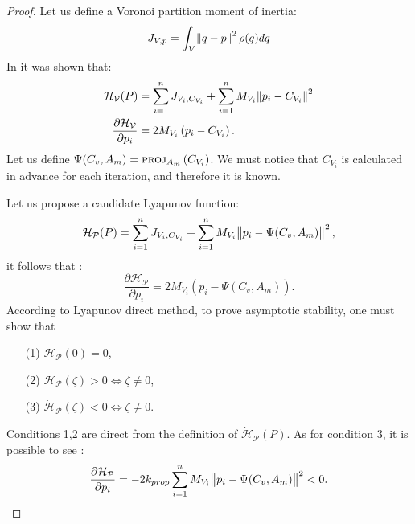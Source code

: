 \documentclass{iacas}
\begin{document}
\begin{proof}
Let us define a Voronoi partition moment of inertia:
\begin{equation}
J_{V,p} = \int_V \norm{q-p}^2 \rho(q)dq
\end{equation}
In \cite{Cortes2004} it was shown that:
\begin{align*}
\mathcal{H}_{\mathcal{V}}(P) &= \sum_{i=1}^n J_{V_i,C_{V_i}} + \sum_{i=1}^n M_{V_i} \norm{p_i - C_{V_i}}^2\\
\frac{\partial \mathcal{H}_{\mathcal{V}}}{\partial p_i} &= 2M_{V_i}\left( p_i - C_{V_i} \right).
\end{align*}
Let us define $\Psi(C_v, A_m) = \textsc{proj}_{A_m}\left( C_{V_{i}} \right)$. We must notice that $C_{V_i}$ is calculated in advance for each iteration, and therefore it is known.

Let us propose a candidate Lyapunov function:
\begin{equation}
\mathcal{\mathcal{H}_{\mathcal{P}}}(P) = \sum_{i=1}^n J_{V_i,C_{V_i}} + \sum_{i=1}^n M_{V_i} \norm{p_i - \Psi(C_v, A_m)}^2,
\end{equation}
it follows that \cite{Cortes2004}:
\begin{equation}
\frac{\partial \mathcal{H}_{\mathcal{P}}}{\partial p_i} = 2M_{V_i}\left( p_i - \Psi(C_v, A_m) \right).
\end{equation}
According to Lyapunov direct method, to prove asymptotic stability, one must show that
    \begin{itemize}
        \item[(1)] $\mathcal{\mathcal{H}_{\mathcal{P}}}(0) = 0$,
        \item[(2)] $\mathcal{\mathcal{H}_{\mathcal{P}}}(\zeta) > 0 \Leftrightarrow \zeta \neq 0$,
        \item[(3)] $\dot{{\mathcal{H}}}_{\mathcal{P}}(\zeta) < 0 \Leftrightarrow \zeta \neq 0$.
    \end{itemize}
Conditions 1,2 are direct from the definition of  $\dot{\mathcal{\mathcal{H}}}_{\mathcal{P}}(P)$.
As for condition 3, it is possible to see \cite{Cortes2004}:
\begin{equation*}
\frac{\partial \mathcal{H}_{\mathcal{P}}}{\partial p_i} = -2k_{prop} \sum_{i=1}^n M_{V_i} \norm{p_i - \Psi(C_v, A_m)}^2 < 0.
\end{equation*}
\end{proof}
\end{document}
